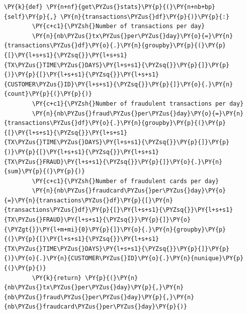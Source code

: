 \begin{tcolorbox}[breakable, size=fbox, boxrule=1pt, pad at break*=1mm,colback=cellbackground, colframe=cellborder]
\begin{Verbatim}[commandchars=\\\{\}]
    \PY{k}{def} \PY{n+nf}{get\PYZus{}stats}\PY{p}{(}\PY{n+nb+bp}{self}\PY{p}{,} \PY{n}{transactions\PYZus{}df}\PY{p}{)}\PY{p}{:}
        \PY{c+c1}{\PYZsh{}Number of transactions per day}
        \PY{n}{nb\PYZus{}tx\PYZus{}per\PYZus{}day}\PY{o}{=}\PY{n}{transactions\PYZus{}df}\PY{o}{.}\PY{n}{groupby}\PY{p}{(}\PY{p}{[}\PY{l+s+s1}{\PYZsq{}}\PY{l+s+s1}{TX\PYZus{}TIME\PYZus{}DAYS}\PY{l+s+s1}{\PYZsq{}}\PY{p}{]}\PY{p}{)}\PY{p}{[}\PY{l+s+s1}{\PYZsq{}}\PY{l+s+s1}{CUSTOMER\PYZus{}ID}\PY{l+s+s1}{\PYZsq{}}\PY{p}{]}\PY{o}{.}\PY{n}{count}\PY{p}{(}\PY{p}{)}
        \PY{c+c1}{\PYZsh{}Number of fraudulent transactions per day}
        \PY{n}{nb\PYZus{}fraud\PYZus{}per\PYZus{}day}\PY{o}{=}\PY{n}{transactions\PYZus{}df}\PY{o}{.}\PY{n}{groupby}\PY{p}{(}\PY{p}{[}\PY{l+s+s1}{\PYZsq{}}\PY{l+s+s1}{TX\PYZus{}TIME\PYZus{}DAYS}\PY{l+s+s1}{\PYZsq{}}\PY{p}{]}\PY{p}{)}\PY{p}{[}\PY{l+s+s1}{\PYZsq{}}\PY{l+s+s1}{TX\PYZus{}FRAUD}\PY{l+s+s1}{\PYZsq{}}\PY{p}{]}\PY{o}{.}\PY{n}{sum}\PY{p}{(}\PY{p}{)}
        \PY{c+c1}{\PYZsh{}Number of fraudulent cards per day}
        \PY{n}{nb\PYZus{}fraudcard\PYZus{}per\PYZus{}day}\PY{o}{=}\PY{n}{transactions\PYZus{}df}\PY{p}{[}\PY{n}{transactions\PYZus{}df}\PY{p}{[}\PY{l+s+s1}{\PYZsq{}}\PY{l+s+s1}{TX\PYZus{}FRAUD}\PY{l+s+s1}{\PYZsq{}}\PY{p}{]}\PY{o}{\PYZgt{}}\PY{l+m+mi}{0}\PY{p}{]}\PY{o}{.}\PY{n}{groupby}\PY{p}{(}\PY{p}{[}\PY{l+s+s1}{\PYZsq{}}\PY{l+s+s1}{TX\PYZus{}TIME\PYZus{}DAYS}\PY{l+s+s1}{\PYZsq{}}\PY{p}{]}\PY{p}{)}\PY{o}{.}\PY{n}{CUSTOMER\PYZus{}ID}\PY{o}{.}\PY{n}{nunique}\PY{p}{(}\PY{p}{)}
        \PY{k}{return} \PY{p}{(}\PY{n}{nb\PYZus{}tx\PYZus{}per\PYZus{}day}\PY{p}{,}\PY{n}{nb\PYZus{}fraud\PYZus{}per\PYZus{}day}\PY{p}{,}\PY{n}{nb\PYZus{}fraudcard\PYZus{}per\PYZus{}day}\PY{p}{)}
    

\end{Verbatim}
\end{tcolorbox}
